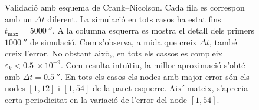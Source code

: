 \begin{figure}[ht]
\begin{subfigure}{.5\textwidth}
		\label{fig:validacio_06}
	\end{subfigure}
	\caption{Validació amb esquema de Crank--Nicolson. Cada fila es correspon amb un $\Delta t$ diferent. La simulació en tots casos ha estat fins $t_\text{max} = 5000 \ \second$. A la columna esquerra es mostra el detall dels primers $1000 \ \second$ de simulació. Com s'observa, a mida que creix $\Delta t$, també creix l'error. No obstant això,, en tots els cassos es compleix $\varepsilon_k < 0.5 \ \times 10^{-9}$. Com resulta intuïtiu, la millor aproximació s'obté amb $\Delta t = 0.5 \ \second$. En tots els casos els nodes amb major error són els nodes $[1,12]$ i $[1,54]$ de la paret esquerre. Així mateix, s'aprecia certa periodicitat en la variació de l'error del node $[1,54]$.}
	\label{fig:validacio_crank_nicolson}
\end{figure}


